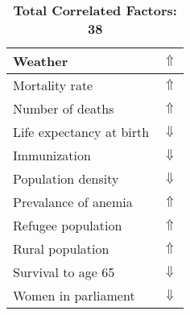 \documentclass[12pt,notitlepage,oneside]{report}
\begin{document}
\begin{table}[!htb]
\begin{tabular}{|l|l|}
Weather & $\Uparrow$\\ \hline
Mortality rate & $\Uparrow$\\ \hline
Number of deaths & $\Uparrow$\\ \hline
Life expectancy at birth & $\Downarrow$\\ \hline
Immunization & $\Downarrow$\\ \hline
Population density & $\Downarrow$\\ \hline
Prevalance of anemia & $\Uparrow$\\ \hline
Refugee population & $\Uparrow$\\ \hline
Rural population & $\Uparrow$\\ \hline
Survival to age 65 & $\Downarrow$\\ \hline
Women in parliament & $\Downarrow$\\ \hline
\end{tabular}
\caption*{\textbf{Total Correlated Factors: 38}}
\end{table}
\clearpage
\end{document}
